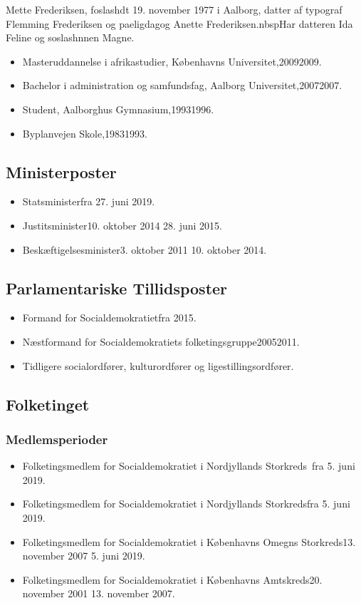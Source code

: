 \documentclass[11pt, a4paper]{awesome-cv}
\begin{document}
\makecvheader[R]
\makelettertitle
\begin{cvletter}
Mette Frederiksen, foslashdt 19. november 1977 i Aalborg, datter af typograf Flemming Frederiksen og paeligdagog Anette Frederiksen.nbspHar datteren Ida Feline og soslashnnen Magne.

\begin{itemize}
\item Masteruddannelse i afrikastudier, Københavns Universitet,20092009.
\item Bachelor i administration og samfundsfag, Aalborg Universitet,20072007.
\item Student, Aalborghus Gymnasium,19931996.
\item Byplanvejen Skole,19831993.
\end{itemize}
\subsection*{Ministerposter}
\begin{itemize}
\item Statsministerfra 27. juni 2019.
\item Justitsminister10. oktober 2014  28. juni 2015.
\item Beskæftigelsesminister3. oktober 2011  10. oktober 2014.
\end{itemize}
\subsection*{Parlamentariske Tillidsposter}
\begin{itemize}
\item Formand for Socialdemokratietfra 2015.
\item Næstformand for Socialdemokratiets folketingsgruppe20052011.
\item Tidligere socialordfører, kulturordfører og ligestillingsordfører.
\end{itemize}
\subsection*{Folketinget}
\subsubsection*{Medlemsperioder}
\begin{itemize}
\item Folketingsmedlem for Socialdemokratiet i Nordjyllands Storkreds fra 5. juni 2019.
\item Folketingsmedlem for Socialdemokratiet i Nordjyllands Storkredsfra 5. juni 2019.
\item Folketingsmedlem for Socialdemokratiet i Københavns Omegns Storkreds13. november 2007  5. juni 2019.
\item Folketingsmedlem for Socialdemokratiet i Københavns Amtskreds20. november 2001  13. november 2007.
\end{itemize}

\end{cvletter}
\end{document}
